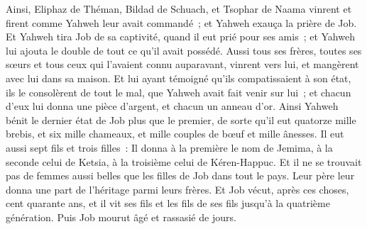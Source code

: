 \begin{multicols}{2}
 Ainsi, Eliphaz de Théman, Bildad de Schuach, et Tsophar de Naama vinrent et firent comme Yahweh leur avait commandé~; et Yahweh exauça la prière de Job.
Et Yahweh tira Job de sa captivité, quand il eut prié pour ses amis~; et Yahweh lui ajouta le double de tout ce qu'il avait possédé.
Aussi tous ses frères, toutes ses sœurs et tous ceux qui l'avaient connu auparavant, vinrent vers lui, et mangèrent avec lui dans sa maison. Et lui ayant témoigné qu'ils compatissaient à son état, ils le consolèrent de tout le mal, que Yahweh avait fait venir sur lui~; et chacun d'eux lui donna une pièce d'argent, et chacun un anneau d'or.
Ainsi Yahweh bénit le dernier état de Job plus que le premier, de sorte qu'il eut quatorze mille brebis, et six mille chameaux, et mille couples de bœuf et mille ânesses.
Il eut aussi sept fils et trois filles~:
Il donna à la première le nom de Jemima, à la seconde celui de Ketsia, à la troisième celui de Kéren-Happuc.
Et il ne se trouvait pas de femmes aussi belles que les filles de Job dans tout le pays. Leur père leur donna une part de l'héritage parmi leurs frères.
Et Job vécut, après ces choses, cent quarante ans, et il vit ses fils et les fils de ses fils jusqu'à la quatrième génération.
Puis Job mourut âgé et rassasié de jours.
\PPE{}
\end{multicols}
